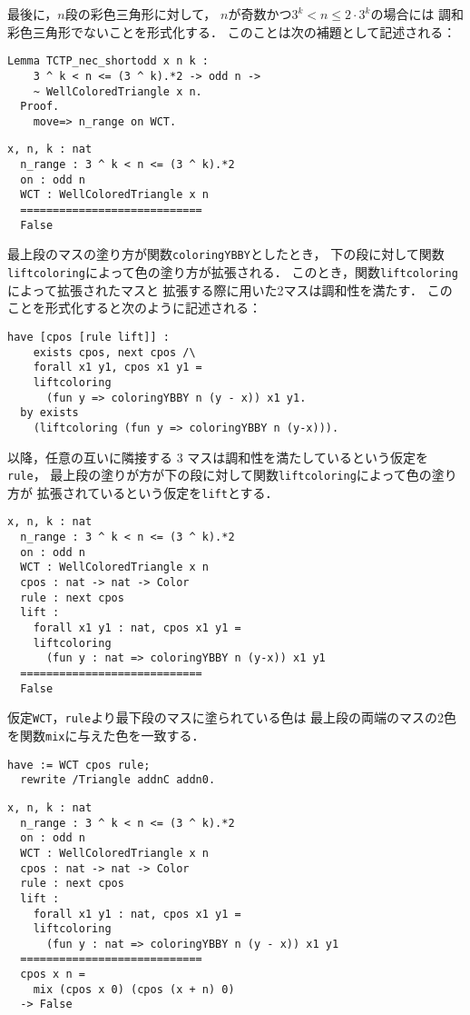 最後に，$n$段の彩色三角形に対して，
$n$が奇数かつ$3^{k} < n \leq 2 \cdot 3^{k}$の場合には
調和彩色三角形でないことを形式化する．
このことは次の補題として記述される：
\begin{lstlisting}[language=Coq]
  Lemma TCTP_nec_shortodd x n k :
    3 ^ k < n <= (3 ^ k).*2 -> odd n ->
    ~ WellColoredTriangle x n.
  Proof.
    move=> n_range on WCT.
\end{lstlisting}
\begin{lstlisting}[language=Coq]
  x, n, k : nat
  n_range : 3 ^ k < n <= (3 ^ k).*2
  on : odd n
  WCT : WellColoredTriangle x n
  ============================
  False
\end{lstlisting}
最上段のマスの塗り方が関数{\tt{coloringYBBY}}としたとき，
下の段に対して関数{\tt{liftcoloring}}によって色の塗り方が拡張される．
このとき，関数{\tt{liftcoloring}}によって拡張されたマスと
拡張する際に用いた2マスは調和性を満たす．
このことを形式化すると次のように記述される：
\begin{lstlisting}[language=Coq]
  have [cpos [rule lift]] :
    exists cpos, next cpos /\
    forall x1 y1, cpos x1 y1 =
    liftcoloring
      (fun y => coloringYBBY n (y - x)) x1 y1.
  by exists
    (liftcoloring (fun y => coloringYBBY n (y-x))).
\end{lstlisting}
以降，任意の互いに隣接する 3 マスは調和性を満たしているという仮定を{\tt{rule}}，
最上段の塗りが方が下の段に対して関数{\tt{liftcoloring}}によって色の塗り方が
拡張されているという仮定を{\tt{lift}}とする．
\begin{lstlisting}[language=Coq]
  x, n, k : nat
  n_range : 3 ^ k < n <= (3 ^ k).*2
  on : odd n
  WCT : WellColoredTriangle x n
  cpos : nat -> nat -> Color
  rule : next cpos
  lift :
    forall x1 y1 : nat, cpos x1 y1 =
    liftcoloring
      (fun y : nat => coloringYBBY n (y-x)) x1 y1
  ============================
  False
\end{lstlisting}
仮定{\tt{WCT}}，{\tt{rule}}より最下段のマスに塗られている色は
最上段の両端のマスの2色を関数{\tt{mix}}に与えた色を一致する．
\begin{lstlisting}[language=Coq]
  have := WCT cpos rule;
  rewrite /Triangle addnC addn0.
\end{lstlisting}
\begin{lstlisting}[language=Coq]
  x, n, k : nat
  n_range : 3 ^ k < n <= (3 ^ k).*2
  on : odd n
  WCT : WellColoredTriangle x n
  cpos : nat -> nat -> Color
  rule : next cpos
  lift :
    forall x1 y1 : nat, cpos x1 y1 =
    liftcoloring
      (fun y : nat => coloringYBBY n (y - x)) x1 y1
  ============================
  cpos x n =
    mix (cpos x 0) (cpos (x + n) 0)
  -> False
\end{lstlisting}
